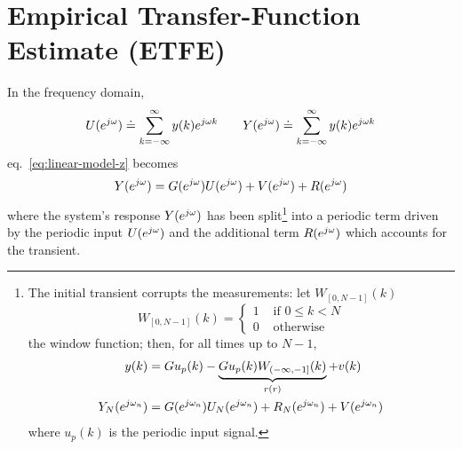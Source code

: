 \section{Empirical Transfer-Function Estimate (ETFE)}
\label{sec:ETFE}

In the frequency domain,
\begin{equation*}
  U(e^{j\omega}) \doteq \sum_{k=-\infty}^{\infty} y(k)e^{j\omega k} \hspace{2em} Y(e^{j\omega}) \doteq \sum_{k=-\infty}^{\infty} y(k)e^{j\omega k}
\end{equation*}
eq.~\eqref{eq:linear-model-z} becomes
\begin{equation}
  \label{eq:model-frequency-domain}
  Y(e^{j\omega}) = G(e^{j\omega})U(e^{j\omega}) + V(e^{j\omega}) + R(e^{j\omega})
\end{equation}
where the system's response $Y(e^{j\omega})$ has been split\footnote{The initial transient corrupts the measurements: let $W_{[0,N-1]}(k)$
  \begin{equation*}
    W_{[0,N-1]}(k) =
    \begin{cases}
      1 & \text{ if } 0\le k < N \\
      0 & \text{ otherwise}
    \end{cases}
  \end{equation*}
  the window function; then, for all times up to $N-1$,
  \begin{align*}
    y(k) &= Gu_p(k) - \underbrace{Gu_p(k)W_{(-\infty,-1]}(k)}_{r(r)} + v(k) \\
    Y_N(e^{j\omega_n}) &= G(e^{j\omega_n})U_N(e^{j\omega_n}) + R_N(e^{j\omega_n}) + V(e^{j\omega_n})
  \end{align*}
  where $u_p(k)$ is the periodic input signal.} into a periodic term driven by the periodic input $U(e^{j\omega})$ and the additional term $R(e^{j\omega})$ which accounts for the transient.

